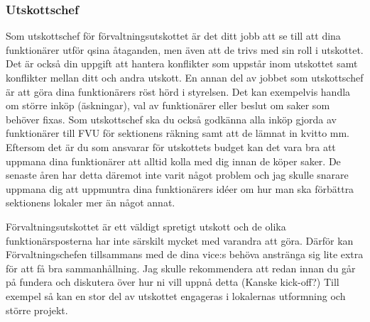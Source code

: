 \documentclass[10pt]{article}
\begin{document}
\subsubsection{Utskottschef}
Som utskottschef för förvaltningsutskottet är det ditt jobb att se till att dina funktionärer utför qsina åtaganden, men även att de trivs med sin roll i utskottet. Det är också din uppgift att hantera konflikter som uppstår inom utskottet samt konflikter mellan ditt och andra utskott. 
En annan del av jobbet som utskottschef är att göra dina funktionärers röst hörd i styrelsen. Det kan exempelvis handla om större inköp (äskningar), val av funktionärer eller beslut om saker som behöver fixas. 
Som utskottschef ska du också godkänna alla inköp gjorda av funktionärer till FVU för sektionens räkning samt att de lämnat in kvitto mm. Eftersom det är du som ansvarar för utskottets budget kan det vara bra att uppmana dina funktionärer att alltid kolla med dig innan de köper saker. 
De senaste åren har detta däremot inte varit något problem och jag skulle snarare uppmana dig att uppmuntra dina funktionärers idéer om hur man ska förbättra sektionens lokaler mer än något annat. \newline

Förvaltningsutskottet är ett väldigt spretigt utskott och de olika funktionärsposterna har inte särskilt mycket med varandra att göra. Därför kan Förvaltningschefen tillsammans med de dina vice:s behöva anstränga sig lite extra för att få bra sammanhållning. 
Jag skulle rekommendera att redan innan du går på fundera och diskutera över hur ni vill uppnå detta (Kanske kick-off?) 
Till exempel så kan en stor del av utskottet engageras i lokalernas utformning och större projekt.
\end{document}
